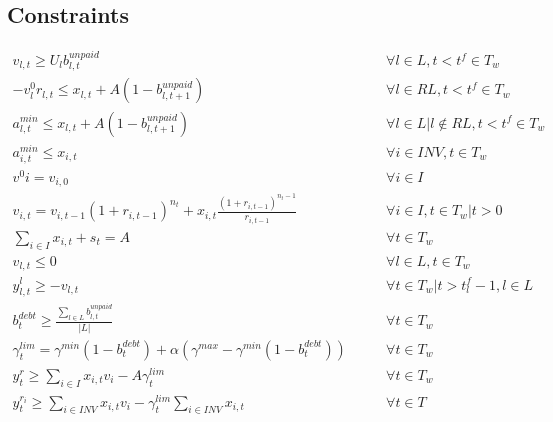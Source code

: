\documentclass[11pt]{article}
\begin{document}
\subsection{Constraints}
\begin{align}
    v_{l, t} \geq U_{l} b^{unpaid}_{l, t} & \qquad \forall l \in L , t < t^f \in T_w \\
    -v^{0}_{l} r_{l, t} \leq x_{l, t} + A (1 - b^{unpaid}_{l, t+1}) & \qquad \forall l \in RL , t < t^f \in T_w \\
    a^{min}_{l, t} \leq x_{l, t} + A (1 - b^{unpaid}_{l, t+1}) & \qquad \forall l \in L | l \notin RL  , t < t^f \in T_w \\
    a^{min}_{i, t} \leq x_{i, t} & \qquad \forall i \in INV, t \in T_w \\
    v^{0}{i} = v_{i, 0} & \qquad \forall i \in I \\
    v_{i, t} = v_{i, t-1} (1 + r_{i, t-1})^{n_t} + x_{i, t} \frac{(1 + r_{i, t-1})^{n_t-1}} {r_{i, t-1}} & \qquad \forall i \in I, t \in T_w| t > 0  \\
    \sum_{i \in I} x_{i, t} + s_t = A & \qquad \forall t \in T_w \\
    v_{l, t} \leq 0 & \qquad \forall l \in L, t \in T_w \\
    y^{l}_{l, t} \geq -v_{l, t} & \qquad \forall t \in T_w| t > t^f_l - 1, l \in L  \\
    b^{debt}_{t} \geq \frac{ \sum_{l \in L} b^{unpaid}_{l, t} } { |L| } & \qquad \forall t \in T_w \\
    \gamma^{lim}_t = \gamma^{min} (1 - b^{debt}_t) + \alpha (\gamma^{max} - \gamma^{min} (1 - b^{debt}_t)) & \qquad \forall t \in T_w \\
    y^{r}_{t} \geq \sum_{i \in I} x_{i, t} v_{i} - A \gamma^{lim}_t & \qquad \forall t \in T_w \\
    y^{r_i}_{t} \geq \sum_{i \in INV} x_{i, t} v_{i} - \gamma^{lim}_t \sum_{i \in INV} x_{i, t} & \qquad \forall t \in T
\end{align}
\end{document}
